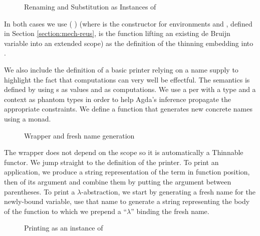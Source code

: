 \begin{figure}[h]
\begin{minipage}{0.5\textwidth}
\end{minipage}\hfill
\begin{minipage}{0.5\textwidth}
\end{minipage}
\caption{Renaming and Substitution as Instances of \semrec{}}
\end{figure}

In both cases we use ( ) (where  is the constructor
for environments and , defined in Section \ref{section:mech-reus}, is the function
lifting an existing de Bruijn variable
into an extended scope) as the definition of the thinning embedding \AB{$\Gamma$}
into {\AB{$\sigma$} \AIC{::} \AB{$\Gamma$}}.

We also include the definition of a basic printer relying on a
name supply to highlight the fact that computations can very well be
effectful. The  semantics is defined by using s
as values and {  } as computations. We use a
per with a type and a context as phantom types in order to
help Agda's inference propagate the appropriate constraints.
We define a function  that generates new concrete names using a
 monad.

\begin{figure}[h]
\caption{Wrapper and fresh name generation}
\end{figure}

The wrapper  does not depend on the scope \AB{$\Gamma$} so it is automatically
a Thinnable functor. We jump straight
to the definition of the printer. To print an application, we produce
a string representation of the term in function position, then of its argument and combine
them by putting the argument between parentheses. To print a $\lambda$-abstraction,
we start by generating a fresh name for the newly-bound variable, use that
name to generate a string representing the body of the function to which we
prepend a ``$\lambda$'' binding the fresh name.

\begin{figure}[h]
\caption{Printing as an instance of \semrec{}}
\end{figure}


